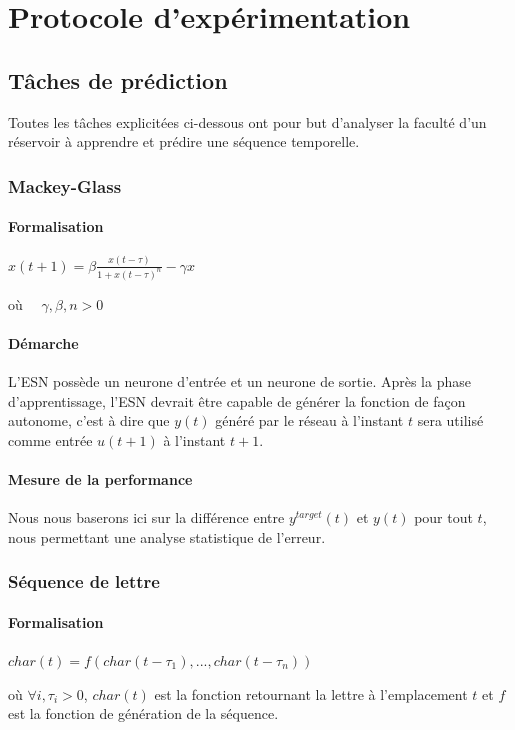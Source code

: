 \documentclass[12pt]{article}
\begin{document}
\section{Protocole d'expérimentation}

\subsection{Tâches de prédiction}

Toutes les tâches explicitées ci-dessous ont pour but d'analyser la faculté d'un réservoir à apprendre et prédire une séquence temporelle.

\subsubsection{Mackey-Glass}
\paragraph{Formalisation}
\begin{center}
$x(t+1) = \beta \frac{ x(t-\tau) }{ 1+{x(t-\tau)}^n }-\gamma x$
\end{center}
où $\quad \gamma,\beta,n > 0$
\paragraph{Démarche}
L'ESN possède un neurone d'entrée et un neurone de sortie. Après la phase d'apprentissage, l'ESN devrait être capable de générer la fonction de façon autonome, c'est à dire que $y(t)$ généré par le réseau à l'instant $t$ sera utilisé comme entrée $u(t+1)$ à l'instant $t+1$.
\paragraph{Mesure de la performance}
Nous nous baserons ici sur la différence entre $y^{target}(t)$ et $y(t)$ pour tout $t$, nous permettant une analyse statistique de l'erreur.


\subsubsection{Séquence de lettre}
\paragraph{Formalisation}
\begin{center}
$char(t) = f( char(t-\tau_{1}),..., char(t-\tau_{n}) )$
\end{center}
où $\forall i, \tau_{i} > 0$, $char(t)$ est la fonction retournant la lettre à l'emplacement $t$ et $f$ est la fonction de génération de la séquence.
\end{document}
